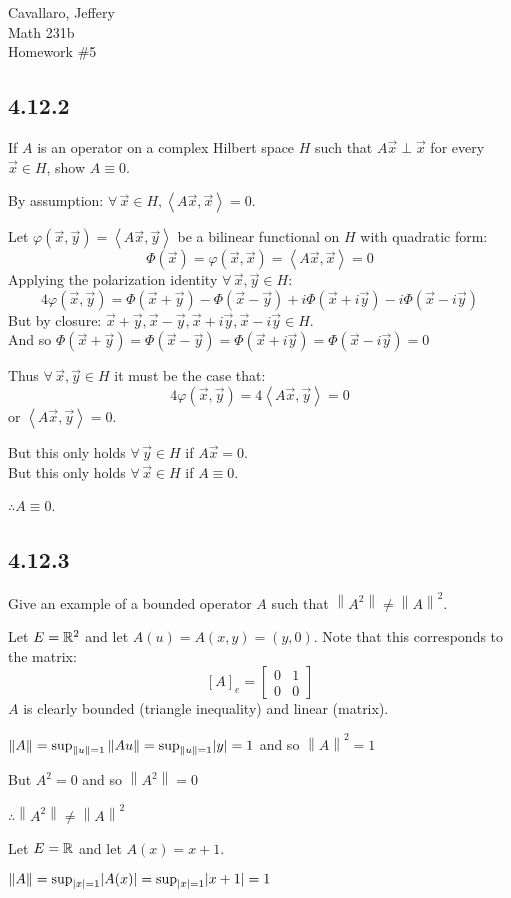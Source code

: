 \documentclass[letterpaper,12pt,fleqn]{article}
\newcommand{\vx}{\vec{x}}
\newcommand{\vy}{\vec{y}}
\newcommand{\norm}[1]{\left\|#1\right\|}
\newcommand{\inner}[1]{\left<#1\right>}
\newcommand{\p}{\varphi}
\renewcommand{\P}{\Phi}
\begin{document}
Cavallaro, Jeffery \\
Math 231b \\
Homework \#5

\subsection*{4.12.2}

If $A$ is an operator on a complex Hilbert space $H$ such that $A\vx\perp\vx$
for every $\vx\in H$, show $A\equiv0$.

By assumption: $\forall\,\vx\in H,\inner{A\vx,\vx}=0$.

Let $\p(\vx,\vy)=\inner{A\vx,\vy}$ be a bilinear functional on $H$ with
quadratic form:
\[\P(\vx)=\p(\vx,\vx)=\inner{A\vx,\vx}=0\]
Applying the polarization identity $\forall\,\vx,\vy\in H$:
\[4\p(\vx,\vy)=\P(\vx+\vy)-\P(\vx-\vy)+i\P(\vx+i\vy)-i\P(\vx-i\vy)\]
But by closure: $\vx+\vy,\vx-\vy,\vx+i\vy,\vx-i\vy\in H$. \\
And so $\P(\vx+\vy)=\P(\vx-\vy)=\P(\vx+i\vy)=\P(\vx-i\vy)=0$

Thus $\forall\,\vx,\vy\in H$ it must be the case that:
\[4\p(\vx,\vy)=4\inner{A\vx,\vy}=0\]
or $\inner{A\vx,\vy}=0$.

But this only holds $\forall\,\vy\in H$ if $A\vx=0$. \\
But this only holds $\forall\,\vx\in H$ if $A\equiv0$.

$\therefore A\equiv0$.

\subsection*{4.12.3}

Give an example of a bounded operator $A$ such that $\norm{A^2}\ne\norm{A}^2$.

Let $E=\mathbb{R}^2$ and let $A(u)=A(x,y)=(y,0)$.
Note that this corresponds to the matrix:
\[[A]_e=\begin{bmatrix} 0 & 1 \\ 0 & 0 \end{bmatrix}\]
$A$ is clearly bounded (triangle inequality) and linear (matrix).

$\norm{A}=\sup_{\norm{u}=1}\norm{Au}=\sup_{\norm{u}=1}\abs{y}=1$ and so
$\norm{A}^2=1$

But $A^2=0$ and so $\norm{A^2}=0$

$\therefore\norm{A^2}\ne\norm{A}^2$

Let $E=\mathbb{R}$ and let $A(x)=x+1$.

$\norm{A}=\sup_{\abs{x}=1}\abs{A(x)}=\sup_{\abs{x}=1}\abs{x+1}=1$
\end{document}
